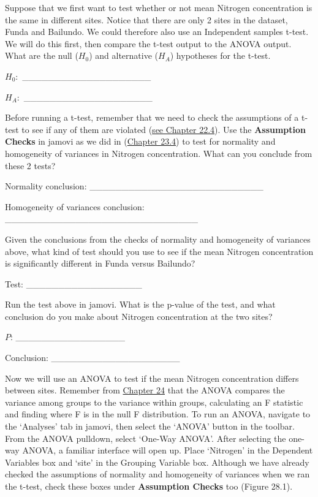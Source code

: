 \documentclass[
  openany]{scrbook}
\begin{document}
Suppose that we first want to test whether or not mean Nitrogen concentration is the same in different sites.
Notice that there are only 2 sites in the dataset, Funda and Bailundo.
We could therefore also use an Independent samples t-test.
We will do this first, then compare the t-test output to the ANOVA output.
What are the null (\(H_{0}\)) and alternative (\(H_{A}\)) hypotheses for the t-test.

\(H_{0}:\) \_\_\_\_\_\_\_\_\_\_\_\_\_\_\_\_\_\_\_\_

\(H_{A}:\) \_\_\_\_\_\_\_\_\_\_\_\_\_\_\_\_\_\_\_\_

Before running a t-test, remember that we need to check the assumptions of a t-test to see if any of them are violated (\protect\hyperlink{assumptions-of-t-tests}{see Chapter 22.4}).
Use the \textbf{Assumption Checks} in jamovi as we did in (\protect\hyperlink{independent-samples-t-test-1}{Chapter 23.4}) to test for normality and homogeneity of variances in Nitrogen concentration.
What can you conclude from these 2 tests?

Normality conclusion: \_\_\_\_\_\_\_\_\_\_\_\_\_\_\_\_\_\_\_\_\_\_\_\_\_\_\_

Homogeneity of variances conclusion: \_\_\_\_\_\_\_\_\_\_\_\_\_\_\_\_\_\_\_\_\_\_\_\_\_\_\_\_\_\_

Given the conclusions from the checks of normality and homogeneity of variances above, what kind of test should you use to see if the mean Nitrogen concentration is significantly different in Funda versus Bailundo?

Test: \_\_\_\_\_\_\_\_\_\_\_\_\_\_\_\_\_\_

Run the test above in jamovi.
What is the p-value of the test, and what conclusion do you make about Nitrogen concentration at the two sites?

\(P\): \_\_\_\_\_\_\_\_\_\_\_\_\_\_\_\_\_

Conclusion: \_\_\_\_\_\_\_\_\_\_\_\_\_\_\_\_\_\_\_\_

Now we will use an ANOVA to test if the mean Nitrogen concentration differs between sites.
Remember from \protect\hyperlink{Chapter_24}{Chapter 24} that the ANOVA compares the variance among groups to the variance within groups, calculating an F statistic and finding where F is in the null F distribution.
To run an ANOVA, navigate to the `Analyses' tab in jamovi, then select the `ANOVA' button in the toolbar.
From the ANOVA pulldown, select `One-Way ANOVA'.
After selecting the one-way ANOVA, a familiar interface will open up.
Place `Nitrogen' in the Dependent Variables box and `site' in the Grouping Variable box.
Although we have already checked the assumptions of normality and homogeneity of variances when we ran the t-test, check these boxes under \textbf{Assumption Checks} too (Figure 28.1).
\end{document}

